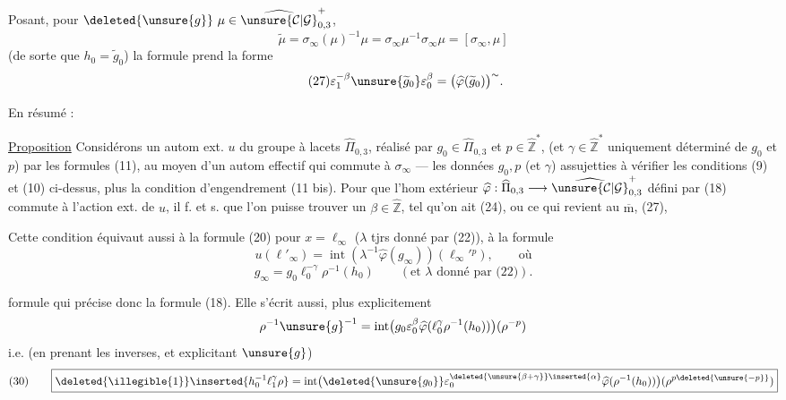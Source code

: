 Posant, pour $\deleted{\unsure{g}}\ \mu\in
\widehat{\unsure{\mathcal C|\mathcal G}}_{0,3}^{+}$,
\[
\tag{26}
\widetilde\mu=\sigma_\infty(\mu)^{-1}\mu
=\sigma_\infty\mu^{-1}\sigma_\infty\mu=[\sigma_\infty,\mu]
\]
(de sorte que $h_0=\widetilde g_0$) la formule  prend la forme
\[
\tag{27}
\varepsilon_1^{-\beta}\unsure{\widetilde g_0}\varepsilon_0^\beta
=\bigl(\widehat\varphi(\widetilde g_0)\bigr)^{\sim}.
\]


En résumé :

\uline{Proposition} Considérons un autom ext. $u$ du groupe à lacets
$\widehat\Pi_{0,3}$, réalisé par $g_0\in\widehat\Pi_{0,3}$
et $p\in\widehat{\mathbb Z}^{*}$,
(et $\gamma\in\widehat{\mathbb Z}^{*}$ uniquement déterminé
 de $g_0$ et $p$)
par les formules (11), au moyen d'un autom effectif
 qui commute à $\sigma_\infty$ ---
les données $g_0,p$ (et $\gamma$)  
assujetties à vérifier les conditions (9) et (10) ci-dessus,
plus la condition d'engendrement (11 bis).
Pour que l'hom extérieur
$\widehat\varphi:\widehat\Pi_{0,3}\longrightarrow
\widehat{\unsure{\mathcal C|\mathcal G}}_{0,3}^{+}$
défini par (18) commute à l'action ext. de $u$,
il f. et s. que l'on puisse trouver un $\beta\in\widehat{\mathbb Z}$,
tel qu'on ait (24), ou ce qui revient au $\overline{\mathrm m}$, (27),

Cette condition  équivaut aussi à la formule
(20) pour $x=\ell_\infty$ ($\lambda$  tjrs donné par (22)),
  à la formule
\[
\tag{28}
u(\ell'_\infty)=\operatorname{int}(\lambda^{-1}\widehat\varphi(g_\infty))
 (\ell_\infty'{}^p),\qquad\text{où}
\]
\[
\tag{29}
g_\infty=g_0\ell_0^{-\gamma}\rho^{-1}(h_0)
\qquad(\text{et }\lambda\text{ donné par (22)}).
\]


formule qui précise donc la formule  (18). Elle s'écrit aussi, plus explicitement
\[
\rho^{-1}\unsure{g}^{-1}
=\operatorname{int}\bigl(g_0\varepsilon_0^{\beta}
\widehat\varphi(\ell_0^{\gamma}\rho^{-1}(h_0))\bigr)
(\rho^{-p})
\]
i.e. (en prenant les inverses, et explicitant $\unsure{g}$)
\[
(30)\qquad
\boxed{
\deleted{\illegible{1}}\inserted{h_0^{-1}\ell_1^{\gamma}\rho}
=\operatorname{int}\bigl(
\deleted{\unsure{g_0}}\varepsilon_0^{\deleted{\unsure{\beta+\gamma}}\inserted{\alpha}}
\widehat\varphi(\rho^{-1}(h_0))\bigr)
(\rho^{p\deleted{\unsure{-p}}})
}
\]

